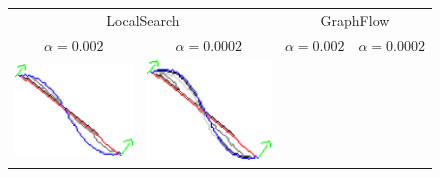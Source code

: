\begin{figure}
\center
\hspace*{-1cm}
\begin{tabular}{cccc}
\multicolumn{2}{c}{LocalSearch} & \multicolumn{2}{c}{GraphFlow}\\
$\alpha=0.002$ & $\alpha=0.0002$ & $\alpha=0.002$ & $\alpha=0.0002$\\
\includegraphics[scale=0.2]{figures/chapter9/constrained-elastica/localsearch/curve-2/len_pen-0.002/radius-15/nc-4/h1.0/summary.pdf} &
\includegraphics[scale=0.2]{figures/chapter9/constrained-elastica/localsearch/curve-2/len_pen-0.0002/radius-15/nc-4/h1.0/summary.pdf} &

\end{tabular}
\end{figure}
